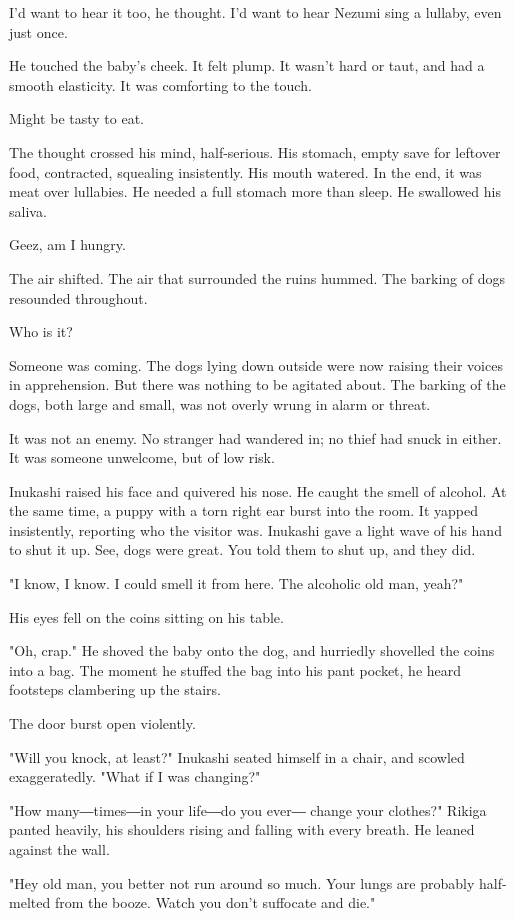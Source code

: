 I'd want to hear it too, he thought. I'd want to hear Nezumi sing a
lullaby, even just once.

He touched the baby's cheek. It felt plump. It wasn't hard or taut, and
had a smooth elasticity. It was comforting to the touch.

Might be tasty to eat.

The thought crossed his mind, half-serious. His stomach, empty save for
leftover food, contracted, squealing insistently. His mouth watered. In
the end, it was meat over lullabies. He needed a full stomach more than
sleep. He swallowed his saliva.

Geez, am I hungry.

The air shifted. The air that surrounded the ruins hummed. The barking
of dogs resounded throughout.

Who is it?

Someone was coming. The dogs lying down outside were now raising their
voices in apprehension. But there was nothing to be agitated about. The
barking of the dogs, both large and small, was not overly wrung in alarm
or threat.

It was not an enemy. No stranger had wandered in; no thief had snuck in
either. It was someone unwelcome, but of low risk.

Inukashi raised his face and quivered his nose. He caught the smell of
alcohol. At the same time, a puppy with a torn right ear burst into the
room. It yapped insistently, reporting who the visitor was. Inukashi
gave a light wave of his hand to shut it up. See, dogs were great. You
told them to shut up, and they did.

"I know, I know. I could smell it from here. The alcoholic old man,
yeah?"

His eyes fell on the coins sitting on his table.

"Oh, crap." He shoved the baby onto the dog, and hurriedly shovelled the
coins into a bag. The moment he stuffed the bag into his pant pocket, he
heard footsteps clambering up the stairs.

The door burst open violently.

"Will you knock, at least?" Inukashi seated himself in a chair, and
scowled exaggeratedly. "What if I was changing?"

"How many―times―in your life―do you ever― change your clothes?" Rikiga
panted heavily, his shoulders rising and falling with every breath. He
leaned against the wall.

"Hey old man, you better not run around so much. Your lungs are probably
half-melted from the booze. Watch you don't suffocate and die."


